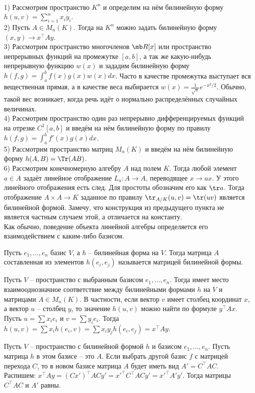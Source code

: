 \exm\\
1) Рассмотрим пространство $K^n$ и определим на нём билинейную форму $h(u,v)=\sum_{i=1}^n x_iy_i$.\\
2) Пусть $A\in M_{n}(K)$. Тогда на $K^n$  можно задать билинейную форму $(x,y)\to x^{\top}Ay$.\\
3) Рассмотрим пространство многочленов $\mb R[x]$ или пространство непрерывных функций на промежутке $[a,b]$, а так же какую-нибудь непрерывную функцию $w(x)$ и зададим билинейную форму $h(f,g)=\int_a^b f(x)g(x)w(x)dx$. Часто  в качестве промежутка выступает вся вещественная прямая, а в качестве веса выбирается $w(x)=\frac{1}{\sqrt{\pi}}e^{-x^2/2}$. Обычно, такой вес возникает, когда речь идёт о нормально распределённых случайных величинах.\\
4) Рассмотрим пространство один раз непрерывно дифференцируемых функций на отрезке $C^1[a,b]$ и введём на нём билинейную форму по правилу $h(f,g)=\int_a^b f'(x)g(x)dx$.\\
5) Рассмотрим пространство матриц $M_n(K)$ и введём на нём билинейную форму $h(A,B)= \Tr(AB)$.\\
6) Рассмотрим конечномерную алгебру $A$ над полем $K$. Тогда любой элемент $a\in A$ задаёт линейное отображение $L_a \colon A \to A$, переводящее $x\to ax$. У этого линейного отображения есть след. Для простоты обозначим его как $\tr a$.
Тогда отображение $A\times A \to K$ заданное по правилу $\tr_{A/K}(u,v)=\tr(uv)$ является билинейной формой. Замечу, что конструкция из предыдущего пункта не является частным случаем этой, а отличается на константу.\\

Как обычно, поведение объекта линейной алгебры определяется его взаимодействием с каким-либо базисом.

\dfn Пусть $e_1, \dots, e_n$ базис $V$, а $h$ -- билинейная форма на $V$. Тогда матрица $A$ составленная из элементов $h(e_i,e_j)$ называется матрицей билинейной формы.
\edfn

\lm Пусть $V$ -- пространство с выбранным базисом $e_1,\dots,e_n$. Тогда имеет место взаимооднозначное соответствие между билинейными формами $h$ на $V$ и матрицами  $A\in M_n(K)$. В частности, если вектор $v$ имеет столбец координат $x$, а вектор $u$ -- столбец $y$, то значение $h(u,v)$ можно найти по формуле $y^{\top}Ax$.
\elm
\proof Пусть $u=\sum x_i e_i$  и $v=\sum y_ie_i$. Тогда $h(u,v)=\sum x_i h(e_i,v)=\sum x_iy_j h(e_i,e_j)=x^{\top}Ay$.
\endproof

\lm Пусть $V$ -- пространство с билинейной формой $h$ и базисом $e_1,\dots,e_n$. Пусть матрица $h$ в этом базисе -- это $A$. Если выбрать другой базис $f$ с матрицей перехода $C$, то в новом базисе матрица $A$ будет иметь вид 
$A'=C^{\top}AC.$
\elm
\proof Распишем: $x^{\top}Ay=(Cx')^\top A Cy'= {x'}^{\top}C^{\top}AC y'= {x'}^\top A' y'$. Тогда матрицы $C^{\top}AC$ и $A'$ равны.
\endproof



